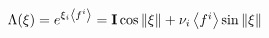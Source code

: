 \begin{equation}\label{LX}  
\Lambda(\xi)=\textstyle{e^{\xi_i \left<f^i\right>}={\bf I}\cos\|\xi\|+
\nu_i \left<f^i\right>}\sin\|\xi\|
\end{equation} 
